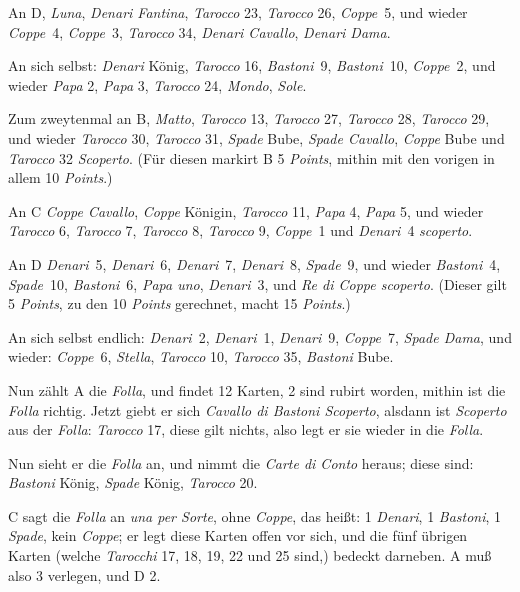 \documentclass[11pt,a6paper,twoside]{article}
\begin{document}
An D, \textit{Luna}, \textit{Denari Fantina}, \textit{Tarocco} 23, \textit{Tarocco} 26, \textit{Coppe}~5, und wieder \textit{Coppe}~4, \textit{Coppe}~3, \textit{Tarocco} 34, \textit{Denari Cavallo}, \textit{Denari Dama}.

An sich selbst: \textit{Denari} König, \textit{Tarocco} 16, \textit{Bastoni}~9, \textit{Bastoni}~10, \textit{Coppe}~2, und wieder \textit{Papa} 2, \textit{Papa} 3, \textit{Tarocco} 24, \textit{Mondo}, \textit{Sole}.

Zum zweytenmal an B, \textit{Matto}, \textit{Tarocco} 13, \textit{Tarocco} 27, \textit{Tarocco} 28, \textit{Tarocco} 29, und wieder \textit{Tarocco} 30, \textit{Tarocco} 31, \textit{Spade} Bube, \textit{Spade Cavallo}, \textit{Coppe} Bube und \textit{Tarocco} 32 \textit{Scoperto}. (Für diesen markirt B 5 \textit{Points}, mithin mit den vorigen in allem 10 \textit{Points}.)

An C \textit{Coppe Cavallo}, \textit{Coppe} Königin, \textit{Tarocco} 11, \textit{Papa} 4, \textit{Papa} 5, und wieder \textit{Tarocco} 6, \textit{Tarocco} 7, \textit{Tarocco} 8, \textit{Tarocco} 9, \textit{Coppe}~1 und \textit{Denari}~4 \textit{scoperto}.

An D \textit{Denari}~5, \textit{Denari}~6, \textit{Denari}~7, \textit{Denari}~8, \textit{Spade}~9, und wieder \textit{Bastoni}~4, \textit{Spade}~10, \textit{Bastoni}~6, \textit{Papa uno}, \textit{Denari}~3, und \textit{Re di Coppe scoperto}. (Dieser gilt 5 \textit{Points}, zu den 10 \textit{Points} gerechnet, macht 15 \textit{Points}.)

An sich selbst endlich: \textit{Denari}~2, \textit{Denari}~1, \textit{Denari}~9, \textit{Coppe}~7, \textit{Spade Dama}, und wieder: \textit{Coppe}~6, \textit{Stella}, \textit{Tarocco} 10, \textit{Tarocco} 35, \textit{Bastoni} Bube.

Nun zählt A die \textit{Folla}, und findet 12 Karten, 2 sind rubirt worden, mithin ist die \textit{Folla} richtig. Jetzt giebt er sich \textit{Cavallo di Bastoni Scoperto}, alsdann ist \textit{Scoperto} aus der \textit{Folla}: \textit{Tarocco} 17, diese gilt nichts, also legt er sie wieder in die \textit{Folla}.

Nun sieht er die \textit{Folla} an, und nimmt die \textit{Carte di Conto} heraus; diese sind: \textit{Bastoni} König, \textit{Spade} König, \textit{Tarocco} 20.

C sagt die \textit{Folla} an \textit{una per Sorte}, ohne \textit{Coppe}, das heißt: 1 \textit{Denari}, 1 \textit{Bastoni}, 1 \textit{Spade}, kein \textit{Coppe}; er legt diese Karten offen vor sich, und die fünf übrigen Karten (welche \textit{Tarocchi} 17, 18, 19, 22 und 25 sind,) bedeckt darneben. A muß also 3 verlegen, und D 2.
\end{document}
